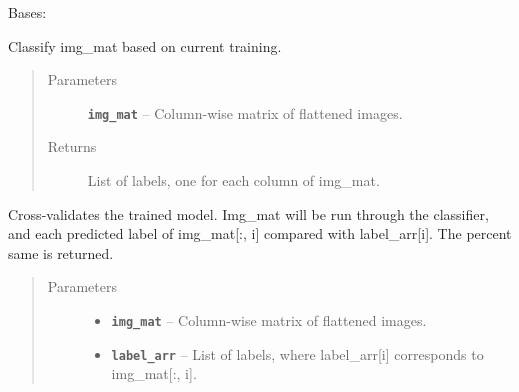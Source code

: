 \documentclass[letterpaper,10pt,english]{sphinxmanual}
\begin{document}
\begin{fulllineitems}
\label{eigenfish:eigenfish.eigenfish.Eigenfish}
Bases: 

\begin{fulllineitems}
\label{eigenfish:eigenfish.eigenfish.Eigenfish.classify}
Classify img\_mat based on current training.
\begin{quote}\begin{description}
\item[{Parameters}] \leavevmode
\textbf{\texttt{img\_mat}} -- Column-wise matrix of flattened images.

\item[{Returns}] \leavevmode
List of labels, one for each column of img\_mat.

\end{description}\end{quote}

\end{fulllineitems}


\begin{fulllineitems}
\label{eigenfish:eigenfish.eigenfish.Eigenfish.cross_validate}
Cross-validates the trained model. Img\_mat will be run through the
classifier, and each predicted label of img\_mat{[}:, i{]} compared with
label\_arr{[}i{]}. The percent same is returned.
\begin{quote}\begin{description}
\item[{Parameters}] \leavevmode\begin{itemize}
\item {} 
\textbf{\texttt{img\_mat}} -- Column-wise matrix of flattened images.

\item {} 
\textbf{\texttt{label\_arr}} -- List of labels, where label\_arr{[}i{]} corresponds to
img\_mat{[}:, i{]}.

\end{itemize}


\end{description}
\end{quote}
\end{fulllineitems}
\end{fulllineitems}
\end{document}
